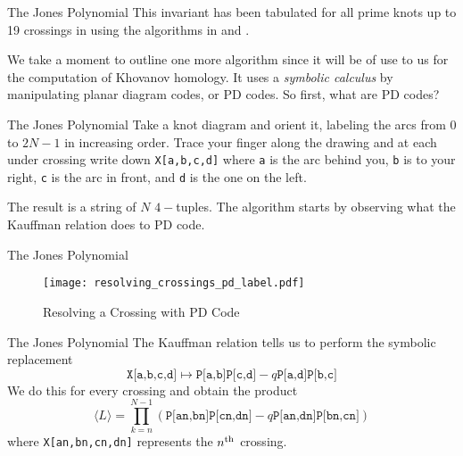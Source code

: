 \documentclass{beamer}
\begin{document}
    \begin{frame}{The Jones Polynomial}
        This invariant has been tabulated for all prime knots up to 19 crossings
        in \cite{JonesData} using the algorithms in \cite{MaguireJones} and
        \cite{Burton2018HOMFLFixedParameter}.
        \par\hfill\par
        We take a moment to outline one more algorithm since it will be of
        use to us for the computation of Khovanov homology. It uses a
        \textit{symbolic calculus} by manipulating planar diagram codes,
        or PD codes. So first, what are PD codes?
    \end{frame}
    \begin{frame}{The Jones Polynomial}
        Take a knot diagram and orient it, labeling the arcs from $0$ to
        $2N-1$ in increasing order. Trace your finger along the drawing and at
        each under crossing write down \texttt{X[a,b,c,d]} where
        \texttt{a} is the arc behind you, \texttt{b} is to your right,
        \texttt{c} is the arc in front, and \texttt{d} is the one on the left.
        \par\hfill\par
        The result is a string of $N$ $4-$tuples. The algorithm starts by
        observing what the Kauffman relation does to PD code.
    \end{frame}
    \begin{frame}{The Jones Polynomial}
        \begin{figure}
            \centering
            \texttt{[image: resolving\_crossings\_pd\_label.pdf]}
            \caption{Resolving a Crossing with PD Code}
        \end{figure}
    \end{frame}
    \begin{frame}{The Jones Polynomial}
        The Kauffman relation tells us to perform the symbolic replacement
        \begin{equation}
            \texttt{X[a,b,c,d]}\mapsto\texttt{P[a,b]P[c,d]}-q\texttt{P[a,d]P[b,c]}
        \end{equation}
        We do this for every crossing and obtain the product
        \begin{equation}
            \langle{L}\rangle
            =\prod_{k=n}^{N-1}
            (\texttt{P[an,bn]P[cn,dn]}-q\texttt{P[an,dn]P[bn,cn]})
        \end{equation}
        where \texttt{X[an,bn,cn,dn]} represents the
        $n^{\small\textrm{th}}$ crossing.
    \end{frame}
\end{document}
